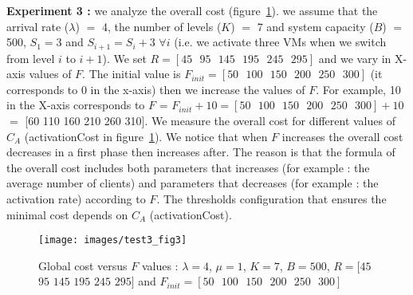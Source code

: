 \documentclass[conference]{IEEEtran}
\begin{document}
\textbf{Experiment 3 :} we analyze the overall cost (figure~\ref{fig:image-chap4-1_par_1_test3_fig3}). we assume that the arrival rate ($\lambda$) $=$ 4, the number of levels ($K$) $=$ 7 and system capacity ($B$) $=$ 500, $S_{1}=3$ and $S_{i+1}=S_{i}+3$ $\forall i$ (i.e. we activate three VMs when we switch from level $i$ to $i+1$). We set $R=[45\mbox{ }95\mbox{ }145\mbox{ }195\mbox{ }245\mbox{ }295]$ and we vary in X-axis values of $F$. The initial value is $F_{init}=[50\mbox{ }100\mbox{ }150\mbox{ }200\mbox{ }250\mbox{ }300]$ (it corresponds to 0 in the x-axis) then we increase the values of $F$. For example, 10 in the X-axis corresponds to $F$ = $F_{init}+10=[50\mbox{ }100\mbox{ }150\mbox{ }200\mbox{ }250\mbox{ }300]+10$ $=$ [60 110 160 210 260 310]. We measure the overall cost for different values of $C_{A}$ (activationCost in figure~\ref{fig:image-chap4-1_par_1_test3_fig3}). We notice that when $F$ increases the overall cost decreases in a first phase then increases after. The reason is that the formula of the overall cost includes both parameters that increases (for example : the average number of clients) and parameters that decreases (for example : the activation rate) according to $F$. The thresholds configuration that ensures the minimal cost depends on $C_{A}$ (activationCost). 

\begin{figure}[!t]
\centering
\texttt{[image: images/test3\_fig3]}
\caption{Global cost versus $F$ values : $\lambda=4$,  $\mu=1$, $K=7$, $B=500$, $R=[45$ $95$ $145$ $195$ $245$ $295]$ and $F_{init}=[50\mbox{ }100\mbox{ }150\mbox{ }200\mbox{ }250\mbox{ }300]$}
\label{fig:image-chap4-1_par_1_test3_fig3}
\end{figure}
\end{document}
